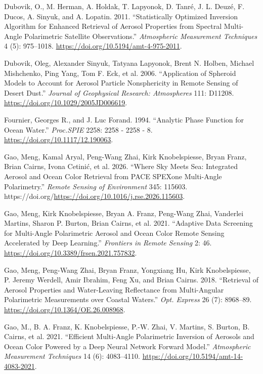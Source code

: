 \documentclass[
  11pt,
  letterpaper,
  DIV=11,
  numbers=noendperiod]{scrreprt}
\newlength{\cslhangindent}
\newenvironment{CSLReferences}[2] %
 {\begin{list}{}{%
  \setlength{\itemindent}{0pt}
  \setlength{\leftmargin}{0pt}
  \setlength{\parsep}{0pt}
  \ifodd #1
   \setlength{\leftmargin}{\cslhangindent}
   \setlength{\itemindent}{-1\cslhangindent}
  \fi
  \setlength{\itemsep}{#2\baselineskip}}}
 {\end{list}}
\begin{document}
\begin{CSLReferences}{1}{0}
Dubovik, O., M. Herman, A. Holdak, T. Lapyonok, D. Tanré, J. L. Deuzé,
F. Ducos, A. Sinyuk, and A. Lopatin. 2011. {``Statistically Optimized
Inversion Algorithm for Enhanced Retrieval of Aerosol Properties from
Spectral Multi-Angle Polarimetric Satellite Observations.''}
\emph{Atmospheric Measurement Techniques} 4 (5): 975--1018.
\url{https://doi.org/10.5194/amt-4-975-2011}.

Dubovik, Oleg, Alexander Sinyuk, Tatyana Lapyonok, Brent N. Holben,
Michael Mishchenko, Ping Yang, Tom F. Eck, et al. 2006. {``Application
of Spheroid Models to Account for Aerosol Particle Nonsphericity in
Remote Sensing of Desert Dust.''} \emph{Journal of Geophysical Research:
Atmospheres} 111: D11208. \url{https://doi.org/10.1029/2005JD006619}.

Fournier, Georges R., and J. Luc Forand. 1994. {``Analytic Phase
Function for Ocean Water.''} \emph{Proc.SPIE} 2258: 2258 - 2258 - 8.
\url{https://doi.org/10.1117/12.190063}.

Gao, Meng, Kamal Aryal, Peng-Wang Zhai, Kirk Knobelspiesse, Bryan Franz,
Brian Cairns, Ivona Cetinić, et al. 2026. {``Where Sky Meets Sea:
Integrated Aerosol and Ocean Color Retrieval from PACE SPEXone
Multi-Angle Polarimetry.''} \emph{Remote Sensing of Environment} 345:
115603. https://doi.org/\url{https://doi.org/10.1016/j.rse.2026.115603}.

Gao, Meng, Kirk Knobelspiesse, Bryan A. Franz, Peng-Wang Zhai, Vanderlei
Martins, Sharon P. Burton, Brian Cairns, et al. 2021. {``Adaptive Data
Screening for Multi-Angle Polarimetric Aerosol and Ocean Color Remote
Sensing Accelerated by Deep Learning.''} \emph{Frontiers in Remote
Sensing} 2: 46. \url{https://doi.org/10.3389/frsen.2021.757832}.

Gao, Meng, Peng-Wang Zhai, Bryan Franz, Yongxiang Hu, Kirk
Knobelspiesse, P. Jeremy Werdell, Amir Ibrahim, Feng Xu, and Brian
Cairns. 2018. {``Retrieval of Aerosol Properties and Water-Leaving
Reflectance from Multi-Angular Polarimetric Measurements over Coastal
Waters.''} \emph{Opt. Express} 26 (7): 8968--89.
\url{https://doi.org/10.1364/OE.26.008968}.

Gao, M., B. A. Franz, K. Knobelspiesse, P.-W. Zhai, V. Martins, S.
Burton, B. Cairns, et al. 2021. {``Efficient Multi-Angle Polarimetric
Inversion of Aerosols and Ocean Color Powered by a Deep Neural Network
Forward Model.''} \emph{Atmospheric Measurement Techniques} 14 (6):
4083--4110. \url{https://doi.org/10.5194/amt-14-4083-2021}.


\end{CSLReferences}
\end{document}
